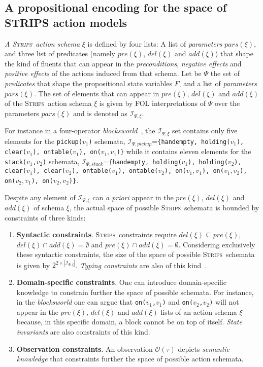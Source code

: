 \documentclass{article}
\newcommand{\strips}{\textsc{Strips}}
\begin{document}
\subsection{A propositional encoding for the space of STRIPS action models}
{\em A \strips\ action schema} $\xi$ is defined by four lists: A list of {\em parameters} $pars(\xi)$, and three list of predicates (namely $pre(\xi)$, $del(\xi)$ and $add(\xi)$) that shape the kind of fluents that can appear in the {\em preconditions}, {\em negative effects} and {\em positive effects} of the actions induced from that schema. Let be $\Psi$ the set of {\em predicates} that shape the propositional state variables $F$, and a list of {\em parameters} $pars(\xi)$. The set of elements that can appear in $pre(\xi)$, $del(\xi)$ and $add(\xi)$ of the \strips\ action schema $\xi$ is given by FOL interpretations of $\Psi$ over the parameters $pars(\xi)$ and is denoted as ${\mathcal I}_{\Psi,\xi}$.

For instance in a four-operator {\em blocksworld}~\cite{slaney2001blocks}, the ${\mathcal I}_{\Psi,\xi}$ set contains only five elements for the {\small \tt pickup($v_1$)} schemata, ${\mathcal I}_{\Psi,pickup}$={\small\tt\{handempty, holding($v_1$), clear($v_1$), ontable($v_1$), on($v_1,v_1$)\}} while it contains eleven elements for the {\small \tt stack($v_1$,$v_2$)} schemata, ${\mathcal I}_{\Psi,stack}$={\small\tt\{handempty, holding($v_1$), holding($v_2$), clear($v_1$), clear($v_2$), ontable($v_1$), ontable($v_2$), on($v_1,v_1$), on($v_1,v_2$), on($v_2,v_1$), on($v_2,v_2$)\}}. 

Despite any element of ${\mathcal I}_{\Psi,\xi}$ can {\em a priori} appear in the $pre(\xi)$, $del(\xi)$ and $add(\xi)$ of schema $\xi$, the actual space of possible \strips\ schemata is bounded by constraints of three kinds:
\begin{enumerate}
\item {\bf Syntactic constraints}. \strips\ constraints require $del(\xi)\subseteq pre(\xi)$, $del(\xi)\cap add(\xi)=\emptyset$ and $pre(\xi)\cap add(\xi)=\emptyset$. Considering exclusively these syntactic constraints, the size of the space of possible \strips\ schemata is given by $2^{2\times|{\mathcal I}_{\Psi,\xi}|}$. {\em Typing constraints} are also of this kind~\cite{mcdermott1998pddl}. 
\item {\bf Domain-specific constraints}. One can introduce domain-specific knowledge to constrain further the space of possible schemata. For instance, in the {\em blocksworld} one can argue that {\small\tt on($v_1$,$v_1$)} and {\small\tt on($v_2$,$v_2$)} will not appear in the $pre(\xi)$, $del(\xi)$ and $add(\xi)$ lists of an action schema $\xi$ because, in this specific domain, a block cannot be on top of itself. {\it State invariants} are also constraints of this kind. 
\item {\bf Observation constraints}. An observation $\mathcal{O}(\tau)$ depicts {\em semantic knowledge} that constraints further the space of possible action schemata.   
\end{enumerate}
\end{document}
